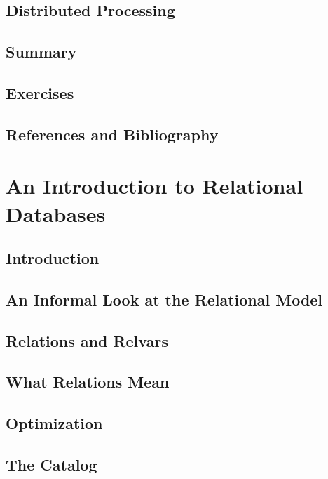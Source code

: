 \documentclass{book}
\begin{document}
\section{Distributed Processing}

\section{Summary}

\section{Exercises}

\section{References and Bibliography}





\chapter{An Introduction to Relational Databases}


\section{Introduction}

\section{An Informal Look at the Relational Model}

\section{Relations and Relvars}

\section{What Relations Mean}

\section{Optimization}

\section{The Catalog}
\end{document}

